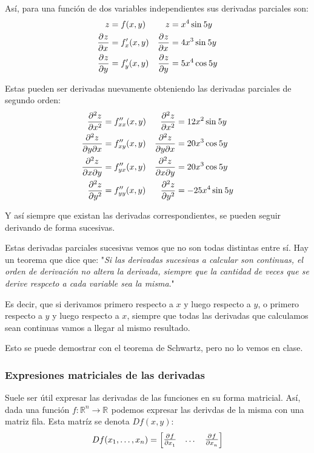 \documentclass[12pt]{article}
\begin{document}
Así, para una función de dos variables independientes sus derivadas parciales son:
\begin{align*}
	z &= f(x,y) & z &= x^{4}\sin^{}5y\\
	\pdv[]{z}{x} &= f_{x}^{\prime}(x,y) & \pdv[]{z}{x} &= 4x^{3}\sin^{}5y\\
	\pdv[]{z}{y} &= f_{y}^{\prime}(x,y) & \pdv[]{z}{y} &= 5x^{4}\cos^{}5y
\end{align*}

Estas pueden ser derivadas nuevamente obteniendo las derivadas parciales de segundo orden:
\begin{align*}
	\pdv[2]{z}{x} &= f_{xx}^{\prime\prime}(x,y) & \pdv[2]{z}{x} &= 12x^{2}\sin^{}5y\\
	\pdv[2]{z}{y}{x} &= f_{xy}^{\prime\prime}(x,y) & \pdv[2]{z}{y}{x} &= 20x^{3}\cos^{}5y\\
	\pdv[2]{z}{x}{y} &= f_{yx}^{\prime\prime}(x,y) & \pdv[2]{z}{x}{y} &= 20x^{3}\cos^{}5y\\
	\pdv[2]{z}{y} &= f_{yy}^{\prime\prime}(x,y) & \pdv[2]{z}{y} &= -25x^{4}\sin^{}5y
\end{align*}

Y así siempre que existan las derivadas correspondientes, se pueden seguir derivando de forma sucesivas.

Estas derivadas parciales sucesivas vemos que no son todas distintas entre sí. Hay un teorema que dice que: "\textit{Si las derivadas sucesivas a calcular son continuas, el orden de derivación no altera la derivada, siempre que la cantidad de veces que se derive respceto a cada variable sea la misma}."

Es decir, que si derivamos primero respecto a $ x $ y luego respecto a $ y $, o primero respecto a $ y $ y luego respecto a $ x $, siempre que todas las derivadas que calculamos sean continuas vamos a llegar al mismo resultado.

Esto se puede demostrar con el teorema de Schwartz, pero no lo vemos en clase.

\subsubsection{Expresiones matriciales de las derivadas}
Suele ser útil expresar las derivadas de las funciones en su forma matricial. Así, dada una función $ f:\mathbb{R}^{n} \to \mathbb{R}^{} $ podemos expresar las derivdas de la misma con una matriz fila. Esta matríz se denota $ Df(x,y) $:
\[
  Df(x_{1},\dots ,x_{n})=\begin{bmatrix}
	  \pdv[]{f}{x_{1}} & \dots & \pdv[]{f}{x_{n}}
  \end{bmatrix}
\]
\end{document}
